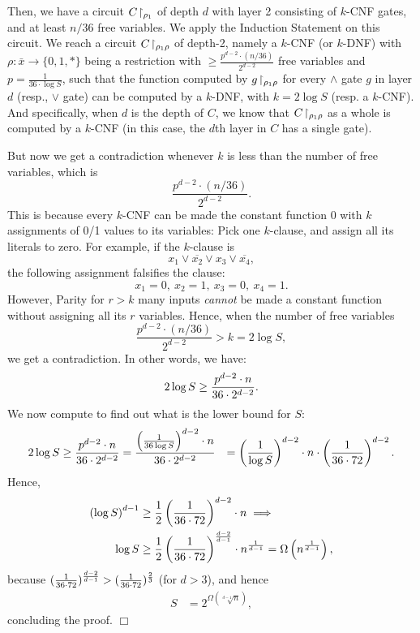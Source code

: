 Then, we have a circuit $C\!\upharpoonright_{\rho_1}$ of depth $d$ with layer 2 consisting of  $k$-CNF gates, and at least $n/36$ free variables. We   apply the Induction Statement on this circuit. We reach a circuit $C\!\upharpoonright_{\rho_1\rho}$ of depth-2, namely a $k$-CNF (or $k$-DNF) with
$\rho: \bar{x} \rightarrow\{0,1, *\}$ being a restriction
with $\geq \frac{p^{d-2} \cdot (n/36)}{2^{d-2}}$ free variables and $p=\frac{1}{36 \cdot \log S}$, such that the function computed by $g\!\upharpoonright_{\rho_1\rho}$ for every $\land$ gate $g$ in layer $d$ (resp., $\lor$ gate) can be computed by a $k$-DNF, with $k=2 \log S$ (resp. a $k$-CNF).
And specifically, when $d$ is the depth of $C$, we know that $C\!\upharpoonright_{\rho_1\rho}$ as a whole is computed by a $k$-CNF (in this case, the $d$th layer in $C$ has a single gate). 


But now we get a contradiction whenever \( k \) is less than the number of free variables, which is 
\[
\frac{p^{d-2} \cdot (n/36)}{2^{d-2}}.
\]
This is because every \( k \)-CNF can be made the  constant function 0 with \( k \) assignments of 0/1 values to its variables: Pick one \( k \)-clause, and assign all its literals to zero. For example, if the $k$-clause is 
\[
x_1 \lor \overline{x_2} \lor x_3 \lor \overline{x_4},
\]
 the following assignment falsifies the clause:  
\[
x_1 = 0, \ x_2 = 1, \ x_3 = 0, \ x_4 = 1.
\]
However, Parity for \( r > k \) many inputs \emph{cannot} be made a constant function without assigning all its \( r \) variables. Hence, when the number of free variables
\[
\frac{p^{d-2} \cdot (n/36)}{2^{d-2}} > k = 2 \log S,
\]
we get  a contradiction.
In other words, we have:
\[
2 \log S \geq \frac{p^{d-2} \cdot n}{36\cdot2^{d-2}}.
\]
We now compute to find out what is the lower bound for $S$:
\begin{align*}
    2 \log S &\ge  \frac{p^{d-2} \cdot n}{36\cdot2^{d-2}} 
 = \frac{\left(\frac{1}{36 \log S}\right)^{d-2} \cdot n}{36\cdot2^{d-2}} 
    & = \left(\frac{1}{\log S}\right)^{d-2} \cdot n \cdot \left(\frac{1}{36\cdot72}\right)^{d-2}.
\end{align*}
Hence, 
\begin{align*}
    \left(\log S\right)^{d-1} &\ge \frac{1}{2} \left(\frac{1}{36\cdot72}\right)^{d-2} \cdot n \implies \\
    \log S &\ge \frac{1}{2} \left(\frac{1}{36\cdot72}\right)^{\frac{d-2}{d-1}} \cdot n^{\frac{1}{d-1}}
= \Omega \left(n^{\frac{1}{d-1}}\right),
\end{align*}
because 
$(\frac{1}{36\cdot 72})^{\frac{d-2}{d-1}}
>
(
\frac{1}{36\cdot 72}
)^{\frac{2}{3}}$ (for $d>3$), and hence 
\begin{align*}
     S &=  2^{\Omega ({\sqrt[d-1]{n}})},
\end{align*}
concluding the proof. 
 \hfill $\Box$

